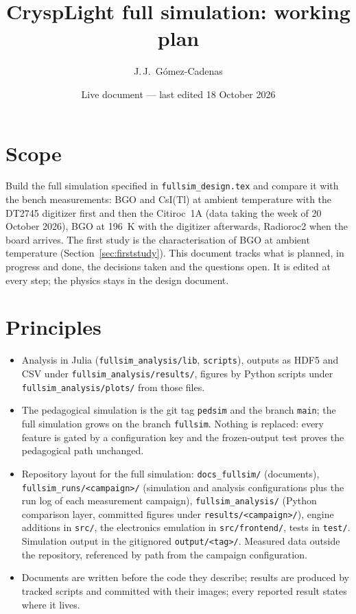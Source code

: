 \documentclass[11pt]{article}
\title{CryspLight full simulation: working plan}
\author{J.\,J.~Gómez-Cadenas}
\date{Live document --- last edited 18 October 2026}
\newcommand{\code}[1]{\texttt{#1}}
\newcommand{\csitl}{CsI(Tl)\xspace}
\begin{document}
\maketitle

\section{Scope}

Build the full simulation specified in \code{fullsim\_design.tex} and compare
it with the bench measurements: BGO and \csitl at ambient temperature with
the DT2745 digitizer first and then the Citiroc~1A (data taking the week of
20 October 2026), BGO at 196~K with the digitizer afterwards, Radioroc2 when
the board arrives. The first study is the characterisation of BGO at ambient
temperature (Section~\ref{sec:firststudy}). This document tracks what is
planned, in progress and done, the decisions taken and the questions open. It
is edited at every step; the physics stays in the design document.

\section{Principles}

\begin{itemize}
\item Analysis in Julia (\code{fullsim\_analysis/lib}, \code{scripts}),
  outputs as HDF5 and CSV under \code{fullsim\_analysis/results/}, figures
  by Python scripts under \code{fullsim\_analysis/plots/} from those files.
\item The pedagogical simulation is the git tag \code{pedsim} and the branch
  \code{main}; the full simulation grows on the branch \code{fullsim}.
  Nothing is replaced: every feature is gated by a configuration key and the
  frozen-output test proves the pedagogical path unchanged.
\item Repository layout for the full simulation: \code{docs\_fullsim/}
  (documents), \code{fullsim\_runs/<campaign>/} (simulation and analysis
  configurations plus the run log of each measurement campaign),
  \code{fullsim\_analysis/} (Python comparison layer, committed figures under
  \code{results/<campaign>/}), engine additions in \code{src/}, the
  electronics emulation in \code{src/frontend/}, tests in \code{test/}.
  Simulation output in the gitignored \code{output/<tag>/}. Measured data
  outside the repository, referenced by path from the campaign configuration.
\item Documents are written before the code they describe; results are
  produced by tracked scripts and committed with their images; every reported
  result states where it lives.
\end{itemize}
\end{document}
